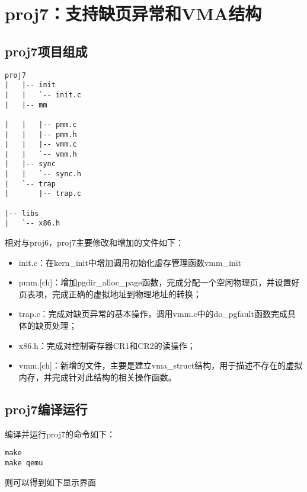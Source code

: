 \section{proj7：支持缺页异常和VMA结构}\label{proj7ux652fux6301ux7f3aux9875ux5f02ux5e38ux548cvmaux7ed3ux6784}

\subsection{proj7项目组成}\label{proj7ux9879ux76eeux7ec4ux6210}

\begin{lstlisting}
proj7
|   |-- init
|   |   `-- init.c   
|   |-- mm

|   |   |-- pmm.c
|   |   |-- pmm.h
|   |   |-- vmm.c
|   |   `-- vmm.h
|   |-- sync
|   |   `-- sync.h
|   `-- trap
|       |-- trap.c

|-- libs
|   `-- x86.h
\end{lstlisting}

相对与proj6，proj7主要修改和增加的文件如下：

\begin{itemize}
\tightlist
\item
  init.c：在kern\_init中增加调用初始化虚存管理函数vmm\_init
\item
  pmm.{[}ch{]}：增加pgdir\_alloc\_page函数，完成分配一个空闲物理页，并设置好页表项，完成正确的虚拟地址到物理地址的转换；
\item
  trap.c：完成对缺页异常的基本操作，调用vmm.c中的do\_pgfault函数完成具体的缺页处理；
\item
  x86.h：完成对控制寄存器CR1和CR2的读操作；
\item
  vmm.{[}ch{]}：新增的文件，主要是建立vma\_struct结构，用于描述不存在的虚拟内存，并完成针对此结构的相关操作函数。
\end{itemize}

\subsection{proj7编译运行}\label{proj7ux7f16ux8bd1ux8fd0ux884c}

编译并运行proj7的命令如下：

\begin{lstlisting}
make
make qemu
\end{lstlisting}

则可以得到如下显示界面

